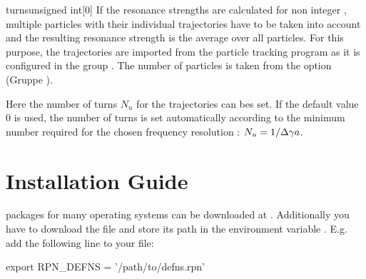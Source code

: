 \documentclass[a4paper]{scrartcl}
\begin{document}
\begin{configdoc}{turns}{unsigned int}{}[0]
  If the resonance strengths are calculated for non integer \ga, multiple particles with
  their individual trajectories have to be taken into account and the resulting resonance
  strength is the average over all particles. For this purpose, the trajectories are
  imported from the particle tracking program as it is configured in the group
  . The number of particles is taken from the option
   (Gruppe ).

  Here the number of turns $N_u$ for the trajectories can bes set. If the default value 0
  is used, the number of turns is set automatically according to the minimum number
  required for the chosen frequency resolution : $N_u = 1/\Delta\gamma a$.
\end{configdoc}




\appendix
\clearpage
\section{\ele Installation Guide}
\label{sec:ele-install}

\ele packages for many operating systems can be downloaded at \cite{elegant-download}.
%
Additionally you have to download the  file and store its path in
the environment variable . E.g. add the following line to your
 file:
\begin{bashcode}
  export RPN_DEFNS = '/path/to/defns.rpn'
\end{bashcode}
\end{document}
